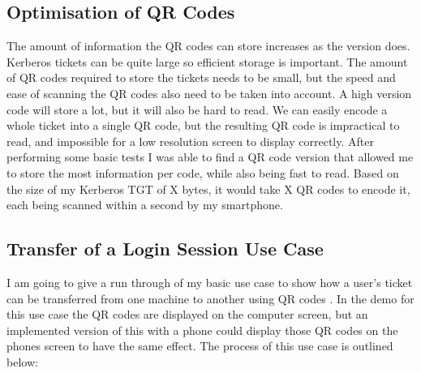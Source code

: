 \documentclass[]{report}   %
\begin{document}
\subsection{Optimisation of QR Codes}
The amount of information the QR codes can store increases as the version does. Kerberos tickets can be quite large so efficient storage is important. The amount of QR codes required to store the tickets needs to be small, but the speed and ease of scanning the QR codes also need to be taken into account. A high version code will store a lot, but it will also be hard to read. We can easily encode a whole ticket into a single QR code, but the resulting QR code is impractical to read, and impossible for a low resolution screen to display correctly. After performing some basic tests I was able to find a QR code version that allowed me to store the most information per code, while also being fast to read. Based on the size of my Kerberos TGT of X bytes, it would take X QR codes to encode it, each being scanned within a second by my smartphone.


\subsection{Transfer of a Login Session Use Case}
I am going to give a run through of my basic use case to show how a user’s ticket can be transferred from one machine to another using QR codes . In the demo for this use case the QR codes are displayed on the computer screen, but an implemented version of this with a phone could display those QR codes on the phones screen to have the same effect. The process of this use case is outlined below:


\end{document}
